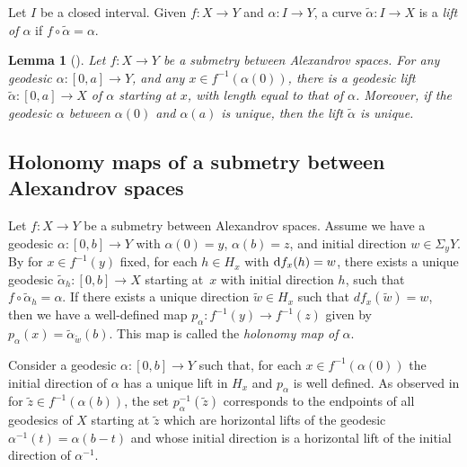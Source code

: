 \documentclass[10pt,a4paper]{amsart}
\numberwithin{equation}{section}
\newtheorem{lem}[thm]{Lemma}
\theoremstyle{definition}
\begin{document}
Let $I$ be a closed interval. Given $f\colon X	\to Y$ and $\alpha\colon I\to Y$, a curve $\tilde{\alpha}\colon I\to X$ is a \emph{lift of $\alpha$} if $f\circ\tilde{\alpha}= \alpha$.

\begin{lem}[]
\label{L: Existence and uniqueness of lifts of geodesics}
Let $f\colon X \to Y$ be a submetry between Alexandrov spaces. For any geodesic $\alpha\colon [0, a] \to Y$, and any $x \in f^{-1}(\alpha(0))$, there is a geodesic lift $\tilde{\alpha}\colon [0, a] \to X$ of $\alpha$ starting at $x$, with length equal to that of $\alpha$. Moreover, if the geodesic $\alpha$ between $\alpha(0)$ and $\alpha(a)$ is unique, then the lift $\tilde{\alpha}$ is unique.
\end{lem}

\subsection{Holonomy maps of a submetry between Alexandrov spaces}\label{S: Holonomy of submetries}

Let $f\colon X\to Y$ be a submetry between Alexandrov spaces. Assume we have a geodesic $\alpha\colon [0,b]\to Y$ with $\alpha(0)=y$, $\alpha(b)=z$, and initial direction $w\in \Sigma_y Y$. By \cite[Lemma 5.4]{Lytchak} for $x\in f^{-1}(y)$ fixed, for each $h\in H_x$ with ${\rm d} f_x(h)=w$, there exists a unique geodesic $\tilde{\alpha}_{h}\colon [0,b]\to X$ starting at~$x$ with initial direction $h$, such that $f\circ\tilde{\alpha}_{h} = \alpha$.
If there exists a unique direction $\tilde{w}\in H_x$ such that $d f_x(\tilde{w})=w$, then we have a well-defined map $p_\alpha\colon f^{-1}(y)\to f^{-1}(z)$ given by
$
p_\alpha(x) = \tilde{\alpha}_{\tilde{w}}(b)$.
This map is called the \emph{holonomy map of $\alpha$}.


Consider a geodesic $\alpha\colon [0,b]\to Y$ such that, for each $x\in f^{-1}(\alpha(0))$ the initial direction of $\alpha$ has a unique lift in $H_x$ and $p_\alpha$ is well defined. As observed in \cite[Section 7.3]{Lytchak} for $\tilde{z}\in f^{-1}(\alpha(b))$, the set $p^{-1}_\alpha(\tilde{z})$ corresponds to the endpoints of all geodesics of $X$ starting at $\tilde{z}$ which are horizontal lifts of the geodesic $\alpha^{-1}(t)=\alpha(b-t)$ and whose initial direction is a horizontal lift of the initial direction of $\alpha^{-1}$.
\end{document}
